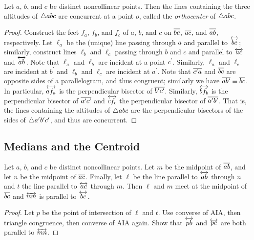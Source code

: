 \begin{prop}
Let \(a\), \(b\), and \(c\) be distinct noncollinear points.
Then the lines containing the three altitudes of \(\bigtriangleup{abc}\) are concurrent at a point \(o\), called the \emph{orthocenter} of \(\bigtriangleup{abc}\).
\end{prop}

\begin{proof}
Construct the feet \(f_a\), \(f_b\), and \(f_c\) of \(a\), \(b\), and \(c\) on \(\overline{bc}\), \(\overline{ac}\), and \(\overline{ab}\), respectively.
Let \(\ell_a\) be the (unique) line passing through \(a\) and parallel to \(\overleftrightarrow{bc}\); similarly, construct lines \(\ell_b\) and \(\ell_c\) passing through \(b\) and \(c\) and parallel to \(\overleftrightarrow{ac}\) and \(\overleftrightarrow{ab}\).
Note that \(\ell_a\) and \(\ell_b\) are incident at a point \(c^\prime\).
Similarly, \(\ell_a\) and \(\ell_c\) are incident at \(b^\prime\) and \(\ell_b\) and \(\ell_c\) are incident at \(a^\prime\).
Note that \(\overline{c^\prime a}\) and \(\overline{bc}\) are opposite sides of a parallelogram, and thus congruent; similarly we have \(\overline{ab^\prime} \equiv \overline{bc}\).
In particular, \(\overleftrightarrow{af_a}\) is the perpendicular bisector of \(\overline{b^\prime c^\prime}\).
Similarly, \(\overleftrightarrow{bf_b}\) is the perpendicular bisector of \(\overline{a^\prime c^\prime}\) and \(\overleftrightarrow{cf_c}\) the perpendicular bisector of \(\overline{a^\prime b^\prime}\).
That is, the lines containing the altitudes of \(\bigtriangleup{abc}\) are the perpendicular bisectors of the sides of \(\bigtriangleup{a^\prime b^\prime c^\prime}\), and thus are concurrent.
\end{proof}

\subsection*{Medians and the Centroid}

\begin{prop}
Let \(a\), \(b\), and \(c\) be distinct noncollinear points.
Let \(m\) be the midpoint of \(\overline{ab}\), and let \(n\) be the midpoint of \(\overline{ac}\).
Finally, let \(\ell\) be the line parallel to \(\overleftrightarrow{ab}\) through \(n\) and \(t\) the line parallel to \(\overleftrightarrow{ac}\) through \(m\).
Then \(\ell\) and \(m\) meet at the midpoint of \(\overline{bc}\) and \(\overleftrightarrow{mn}\) is parallel to \(\overleftrightarrow{bc}\).
\end{prop}

\begin{proof}
Let \(p\) be the point of intersection of \(\ell\) and \(t\).
Use converse of AIA, then triangle congruence, then converse of AIA again.
Show that \(\overleftrightarrow{pb}\) and \(\overleftrightarrow{pc}\) are both parallel to \(\overleftrightarrow{mn}\).
\end{proof}